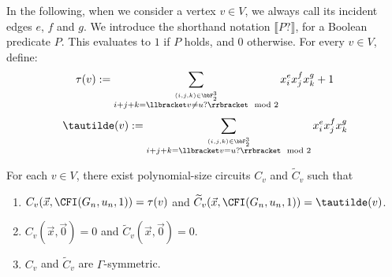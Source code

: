 \documentclass[a4paper,UKenglish,cleveref, autoref, thm-restate]{lipics-v2021}
\begin{document}
In the following, when we consider a vertex $v \in V$, we always call its incident edges $e$, $f$ and $g$. We introduce the shorthand notation $\llbracket P? \rrbracket$, for a Boolean predicate $P$. This evaluates to $1$ if $P$ holds, and $0$ otherwise.
For every $v \in V$, define:
\[
\tau(v) := \sum_{\stackrel{(i,j,k) \in \bbF_2^3}{i+j+k = \llbracket v \neq u? \rrbracket \mod 2}} x_i^{e} x^{f}_j x^{g}_k + 1
\]
\[
\tautilde(v) := \sum_{\stackrel{(i,j,k) \in \bbF_2^3}{i+j+k = \llbracket v = u? \rrbracket \mod 2}} x_i^{e} x^{f}_j x^{g}_k
\]
\begin{lemma}
	\label{lem:tauPolynomialsComputable}
	For each $v \in V$, there exist polynomial-size circuits $C_v$ and $\widetilde{C}_v$ such that 
	\begin{enumerate}
		\item $C_v(\vec x, \CFI(G_n, u_n, 1)) = \tau(v)$ and $\widetilde{C}_v(\vec x, \CFI(G_n, u_n, 1)) = \tautilde(v)$. 
		\item $C_v(\vec x, \vec 0) = 0$ and $\widetilde{C}_v(\vec x, \vec 0) = 0$.
		\item $C_v$ and $\widetilde{C}_v$ are $\Gamma$-symmetric.
	\end{enumerate}	
\end{lemma}	
\end{document}
